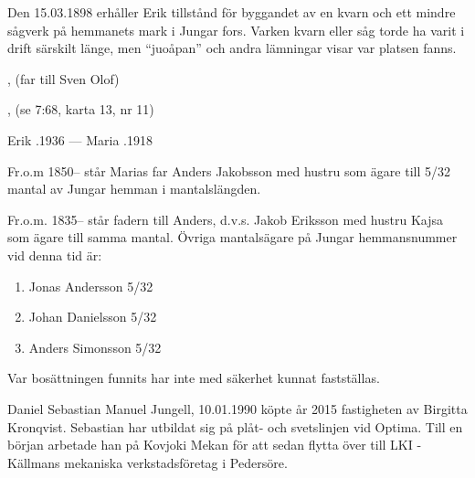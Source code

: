 Den 15.03.1898 erhåller Erik tillstånd för byggandet av en kvarn och ett mindre sågverk på hemmanets mark i Jungar fors. Varken kvarn eller såg torde ha varit i drift särskilt länge, men ``juoåpan'' och andra lämningar visar var platsen fanns.
\begin{jhchildren}
  \item {}
  \item {}
  \item {}, (far till Sven Olof)
  \item {}, (se 7:68, karta 13, nr 11)
  \item {}
  \item {}
\end{jhchildren}

Erik .1936  ---  Maria .1918

Fr.o.m 1850-- står Marias far Anders Jakobsson med hustru som ägare till 5/32 mantal av Jungar hemman i mantalslängden.

Fr.o.m. 1835-- står fadern till Anders, d.v.s. Jakob Eriksson med hustru Kajsa som ägare till samma mantal. Övriga mantalsägare på Jungar hemmansnummer vid denna tid är:
\begin{enumerate}
  \item Jonas Andersson 5/32
  \item Johan Danielsson 5/32
  \item Anders Simonsson 5/32
\end{enumerate}

Var bosättningen funnits har inte med säkerhet kunnat fastställas.






Daniel Sebastian Manuel Jungell, 10.01.1990 köpte år 2015 fastigheten av Birgitta Kronqvist. Sebastian har utbildat sig på plåt- och svetslinjen vid Optima. Till en början arbetade han på Kovjoki Mekan för att sedan flytta över till LKI -Källmans mekaniska verkstadsföretag i Pedersöre.


